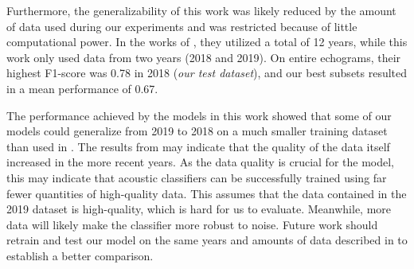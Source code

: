    
    
    Furthermore, the generalizability of this work was likely reduced by the amount of data used during our experiments and was restricted because of little computational power. In the works of \citeauthor{brautaset2020acoustic}, they utilized a total of 12 years, while this work only used data from two years (2018 and 2019). On entire echograms, their highest F1-score was 0.78 in 2018 (\textit{our test dataset}), and our best subsets resulted in a mean performance of 0.67.
    
    The performance achieved by the models in this work showed that some of our models could generalize from 2019 to 2018 on a much smaller training dataset than used in \citeauthor{brautaset2020acoustic}. The results from \citeauthor{brautaset2020acoustic} may indicate that the quality of the data itself increased in the more recent years. As the data quality is crucial for the model, this may indicate that acoustic classifiers can be successfully trained using far fewer quantities of high-quality data. This assumes that the data contained in the 2019 dataset is high-quality, which is hard for us to evaluate. Meanwhile, more data will likely make the classifier more robust to noise. Future work should retrain and test our model on the same years and amounts of data described in \citeauthor{brautaset2020acoustic} to establish a better comparison.  
    
